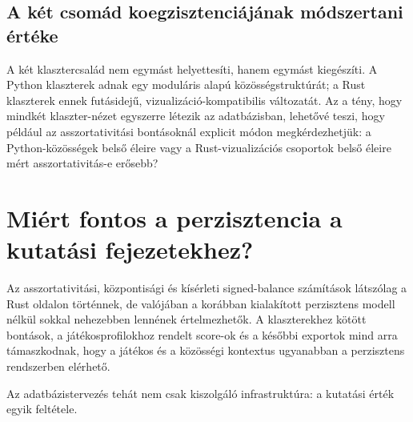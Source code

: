 \subsection{A két csomád koegzisztenciájának módszertani értéke}

A két klasztercsalád nem egymást helyettesíti, hanem egymást kiegészíti. A Python klaszterek adnak egy moduláris alapú közösségstruktúrát; a Rust klaszterek ennek futásidejű, vizualizáció-kompatibilis változatát. Az a tény, hogy mindkét klaszter-nézet egyszerre létezik az adatbázisban, lehetővé teszi, hogy például az asszortativitási bontásoknál explicit módon megkérdezhetjük: a Python-közösségek belső éleire vagy a Rust-vizualizációs csoportok belső éleire mért asszortativitás-e erősebb?

\section{Miért fontos a perzisztencia a kutatási fejezetekhez?}

Az asszortativitási, központisági és kísérleti signed-balance számítások látszólag a Rust oldalon történnek, de valójában a korábban kialakított perzisztens modell nélkül sokkal nehezebben lennének értelmezhetők. A klaszterekhez kötött bontások, a játékosprofilokhoz rendelt score-ok és a későbbi exportok mind arra támaszkodnak, hogy a játékos és a közösségi kontextus ugyanabban a perzisztens rendszerben elérhető.

Az adatbázistervezés tehát nem csak kiszolgáló infrastruktúra: a kutatási érték egyik feltétele.
